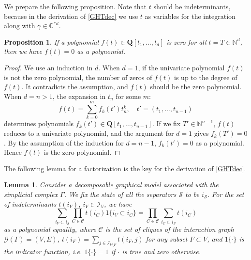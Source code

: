 \documentclass[a4paper,12pt]{article}
\theoremstyle{plain}
\newtheorem{proposition}[theorem]{Proposition}
\newtheorem{lemma}[theorem]{Lemma}
\theoremstyle{remark}
\begin{document}
We prepare the following proposition. Note that $t$ should be
indeterminants, because in the derivation of \eqref{GHTdec}
we use $t$ as variables for the integration along with
$\gamma\in{\mathbb{C}^{*d}}$. 

\begin{proposition}\label{prop:zero}
  If a polynomial $f(t) \in \mathbf{Q}[t_1,\ldots,t_d]$ is
  zero for all $t=T \in \mathbb{N}^d$,
  then we have $f(t)=0$ as a polynomial.
\end{proposition}

\begin{proof}
  We use an induction in $d$. When $d=1$, if the univariate
  polynomial $f(t)$ is not the zero polynomial, the number of
  zeros of $f(t)$ is up to the degree of $f(t)$. It
  contradicts the assumption, and $f(t)$ should be the zero
  polynomial. When $d=n>1$, the expansion in $t_n$ for some
  $m$:
  \[
    f(t)=\sum_{k=0}^m f_k(t') t_n^k, \quad t'=(t_1,\ldots,t_{n-1})
  \]
  determines polynomials
  $f_k(t')\in \mathbf{Q}[t_1, \ldots, t_{n-1}]$. If we fix
  $T'\in\mathbb{N}^{n-1}$, $f(t)$ reduces to a univariate
  polynomial, and the argument for $d=1$ gives $f_k(T')=0$.
  By the assumption of the induction for $d=n-1$, $f_k(t')=0$
  as a polynomial. Hence $f(t)$ is the zero polynomial.
\end{proof}

The following lemma for a factorization is the key for
the derivation of \eqref{GHTdec}.

\begin{lemma}\label{lemm:factor}
  Consider a decomposable graphical model associated with
  the simplicial complex $\Gamma$. We fix the state of
  all the separators $\mathcal{S}$ to be $i_{\mathcal{S}}$.
  For the set of indeterminants $t(i_V)$, $i_V\in\mathcal{I}_V$,
  we have
  \begin{equation}
    \sum_{i_V{\subset} i_{\mathcal{S}}}\prod_{C\in\mathcal{C}}
    t(i_{C})1\{{i_V\subset i_C}\}=\prod_{C\in\mathcal{C}}
    \sum_{i_C{\subset} i_{\mathcal{S}}}
    t(i_{C})
    \label{factor}
  \end{equation}
  as a polynomial equality, where $\mathcal{C}$ is the set
  of cliques of the interaction graph $\mathcal{G}(\Gamma)=(V,E)$,
  $t(i_F)=\sum_{j\in\mathcal{I}_{V\setminus F}}t(i_F,j)$ for
  any subset $F\subset V$, and $1\{\cdot\}$ is the indicator
  function, i.e. $1\{\cdot\}=1$ if $\cdot$ is true and zero
  otherwise.
\end{lemma}
\end{document}
